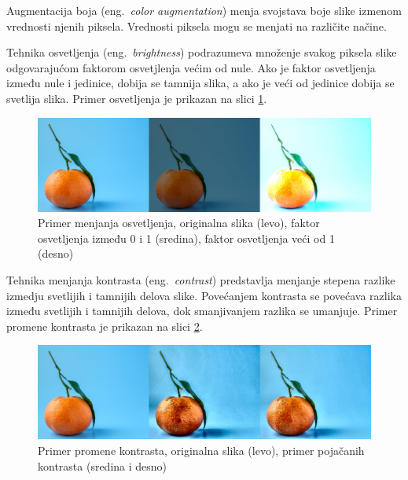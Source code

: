 \documentclass[12pt,oneside]{memoir}
\begin{document}
Augmentacija boja (eng.~\textit{color augmentation}) menja svojstava boje slike izmenom vrednosti njenih piksela. Vrednosti piksela mogu se menjati na različite načine.

Tehnika osvetljenja (eng.~\textit{brightness}) podrazumeva množenje svakog piksela slike odgovarajućom faktorom osvetjlenja većim od nule. Ako je faktor osvetljenja između nule i jedinice, dobija se tamnija slika, a ako je veći od jedinice dobija se svetlija slika. Primer osvetljenja je prikazan na slici \ref{fig:section3_brightness}.

\begin{figure}[ht]
    \centering
    \includegraphics[width=1\textwidth]{matfmaster/glava3/brightness.jpg}
    \caption{Primer menjanja osvetljenja, originalna slika (levo), faktor osvetljenja između 0 i 1 (sredina), faktor osvetljenja veći od 1 (desno) \cite{unsplashOrange}} 
    \label{fig:section3_brightness}
\end{figure}


Tehnika menjanja kontrasta (eng.~\textit{contrast}) predstavlja menjanje stepena razlike izmedju svetlijih i tamnijih delova slike. Povećanjem kontrasta se povećava razlika između svetlijih i tamnijih delova, dok smanjivanjem razlika se umanjuje. Primer promene kontrasta je prikazan na slici \ref{fig:section3_contrast}.

\begin{figure}[ht]
    \centering
    \includegraphics[width=1\textwidth]{matfmaster/glava3/contrast.jpg}
    \caption{Primer promene kontrasta, originalna slika (levo), primer pojačanih kontrasta (sredina i desno) \cite{unsplashOrange}} 
    \label{fig:section3_contrast}
\end{figure}
\end{document}
